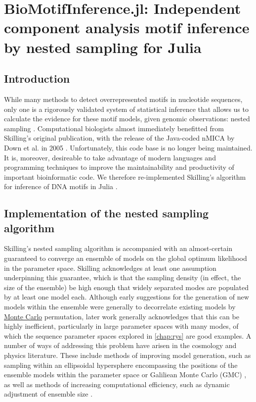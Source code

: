 \chapter{BioMotifInference.jl: Independent component analysis motif inference by nested sampling for Julia}
\label{ch:BMI}
\section{Introduction}
While many methods to detect overrepresented motifs in nucleotide sequences, only one is a rigorously validated system of statistical inference that allows us to calculate the evidence for these motif models, given genomic observations: nested sampling \cite{Skilling2006}. Computational biologists almost immediately benefitted from Skilling's original publication, with the release of the Java-coded nMICA by Down et al. in 2005 \cite{Down2005}. Unfortunately, this code base is no longer being maintained. It is, moreover, desireable to take advantage of modern languages and programming techniques to improve the maintainability and productivity of important bioinformatic code. We therefore re-implemented Skilling's algorithm for inference of DNA motifs in Julia \cite{Bezanson2015}.

\section{Implementation of the nested sampling algorithm}

Skilling's nested sampling algorithm is accompanied with an almost-certain guaranteed to converge an ensemble of models on the global optimum likelihood in the parameter space\cite{Skilling2006}. Skilling acknowledges at least one assumption underpinning this guarantee, which is that the sampling density (in effect, the size of the ensemble) be high enough that widely separated modes are populated by at least one model each. Although early suggestions for the generation of new models within the ensemble were generally to decorrelate existing models by \hyperref[MonteCarlo]{Monte Carlo} permutation, later work generally acknowledges that this can be highly inefficient, particularly in large parameter spaces with many modes, of which the sequence parameter spaces explored in \autoref{chap:rys} are good examples. A number of ways of addressing this problem have arisen in the cosmology and physics literature. These include methods of improving model generation, such as sampling within an ellipsoidal hypersphere encompassing the positions of the ensemble models within the parameter space \cite{Feroz2008,Feroz2009} or Galiliean Monte Carlo (GMC) \cite{Skilling2012}, as well as methods of increasing computational efficiency, such as dynamic adjustment of ensemble size \cite{Higson2019}. 

